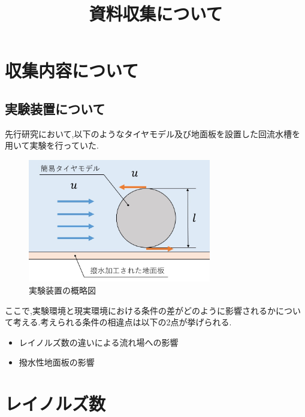 \documentclass[twocolumn,a4j]{jsarticle}
\author{}
\title{資料収集について}
\date{}
\begin{document}
\maketitle
\section{\large 収集内容について}
\subsection{実験装置について}
先行研究において,以下のようなタイヤモデル及び地面板を設置した回流水槽を用いて実験を行っていた.\par
\begin{figure}[htbp]
    \begin{center}
        \includegraphics[width=80mm]{images/image_1.jpg}
        \caption{実験装置の概略図}
    \end{center}
\end{figure}
ここで,実験環境と現実環境における条件の差がどのように影響されるかについて考える.考えられる条件の相違点は以下の2点が挙げられる.
\begin{itemize}
    \item レイノルズ数の違いによる流れ場への影響
    \item 撥水性地面板の影響
\end{itemize}
\section{\large レイノルズ数}
\end{document}
